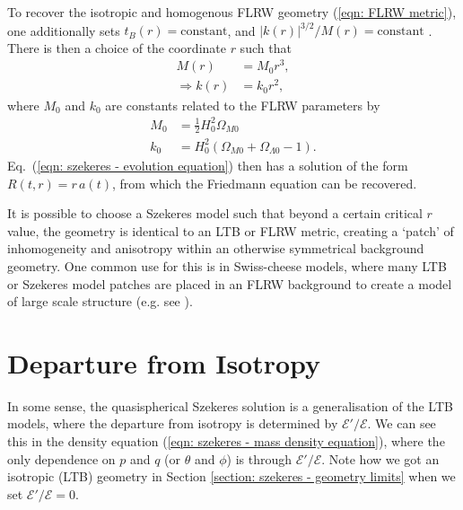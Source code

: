 \documentclass[a4paper,12pt]{report}
\renewcommand{\eqref}[1]{Eq.~({#1})}
\begin{document}
To recover the isotropic and homogenous FLRW geometry (\ref{eqn: FLRW metric}), one additionally sets $t_B(r) = \text{constant}$, and $|k(r)|^{3/2}/M(r) = \text{constant}$ \cite{RN4}. There is then a choice of the coordinate $r$ such that
\begin{align}
  M(r) &= M_0 r^3, \\
  \Longrightarrow k(r) &= k_0 r^2,
\end{align}
where $M_0$ and $k_0$ are constants related to the FLRW parameters by
\begin{align}
  M_0 &= \frac{1}{2}H_0^2 \Omega_{M0} \\
  k_0 &= H_0^2(\Omega_{M0} + \Omega_{\Lambda 0} - 1).
\end{align}
\eqref{\ref{eqn: szekeres - evolution equation}} then has a solution of the form $R(t,r) = r\,a(t)$, from which the Friedmann equation can be recovered.

It is possible to choose a Szekeres model such that beyond a certain critical $r$ value, the geometry is identical to an LTB or FLRW metric, creating a `patch' of inhomogeneity and anisotropy within an otherwise symmetrical background geometry. One common use for this is in Swiss-cheese models, where many LTB or Szekeres model patches are placed in an FLRW background to create a model of large scale structure (e.g. see \cite{RN142,RN141,RN140}).


\section{Departure from Isotropy} \label{section: szekeres - anisotropy}
In some sense, the quasispherical Szekeres solution is a generalisation of the LTB models, where the departure from isotropy is determined by $\mathcal{E}'/\mathcal{E}$. We can see this in the density equation (\ref{eqn: szekeres - mass density equation}), where the only dependence on $p$ and $q$ (or $\theta$ and $\phi$) is through $\mathcal{E}'/\mathcal{E}$. Note how we got an isotropic (LTB) geometry in Section \ref{section: szekeres - geometry limits} when we set $\mathcal{E}'/\mathcal{E} = 0$.
\end{document}

